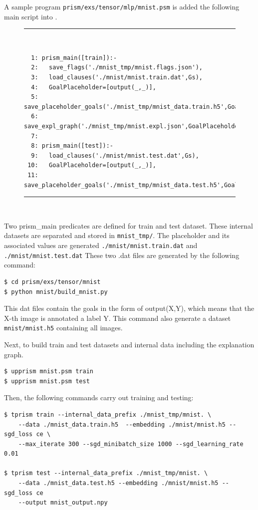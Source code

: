 \documentclass[a4paper]{report}
\begin{document}
A sample program {\tt prism/exs/tensor/mlp/mnist.psm} is added the following main script into .
\begin{figure}[h]
	\rule{0.85\textwidth}{0.10mm}\\ [-1em]
	\begin{verbatim}
  1: prism_main([train]):-
  2:   save_flags('./mnist_tmp/mnist.flags.json'),
  3:   load_clauses('./mnist/mnist.train.dat',Gs),
  4:   GoalPlaceholder=[output(_,_)],
  5:   save_placeholder_goals('./mnist_tmp/mnist_data.train.h5',GoalPlaceholder,Gs),
  6:   save_expl_graph('./mnist_tmp/mnist.expl.json',GoalPlaceholder).
  7: 
  8: prism_main([test]):-
  9:   load_clauses('./mnist/mnist.test.dat',Gs),
 10:   GoalPlaceholder=[output(_,_)],
 11:   save_placeholder_goals('./mnist_tmp/mnist_data.test.h5',GoalPlaceholder,Gs).
	\end{verbatim}
	\rule{0.85\textwidth}{0.10mm}\\ [-1em]
\end{figure}

Two {prism\_main} predicates are defined for train and test dataset.
These internal datasets are separated and stored in 
\verb|mnist_tmp/|.
The placeholder and its associated values are generated {\tt ./mnist/mnist.train.dat} and {\tt ./mnist/mnist.test.dat}
These two .dat files are generated by the following command:
\begin{verbatim}
$ cd prism/exs/tensor/mnist
$ python mnist/build_mnist.py
\end{verbatim}
This dat files contain the goals in the form of output(X,Y), which means that the X-th image is annotated a label Y.
This command also generate a dataset {\tt mnist/mnist.h5} containing all images.

Next, to build train and test datasets and internal data including the explanation graph. 
\begin{verbatim}
$ upprism mnist.psm train
$ upprism mnist.psm test
\end{verbatim}
 
Then, the following commands carry out training and testing:
\begin{verbatim}
$ tprism train --internal_data_prefix ./mnist_tmp/mnist. \
    --data ./mnist_data.train.h5  --embedding ./mnist/mnist.h5 --sgd_loss ce \
    --max_iterate 300 --sgd_minibatch_size 1000 --sgd_learning_rate 0.01
  
$ tprism test --internal_data_prefix ./mnist_tmp/mnist. \
    --data ./mnist_data.test.h5 --embedding ./mnist/mnist.h5 --sgd_loss ce  
    --output mnist_output.npy
\end{verbatim}
\end{document}
